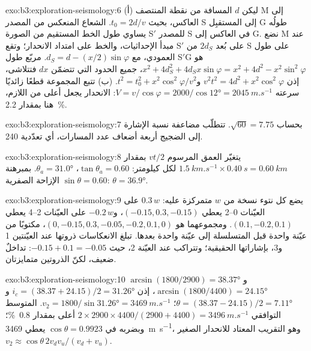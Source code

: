\begin{solution}{exo:b3:exploration-seismology:6}
(أ) ليكن $d$ المسافة من نقطة المنتصف M إلى العاكس، بحيث
$t_0 = 2d/v$. الشعاع المنعكس من المصدر S إلى المستقبِل G طولُه
يساوي طول الخط المستقيم من الصورة S$'$ للمصدر S في العاكس إلى G. نضع M عند
مبدأ الإحداثيات، والخط على امتداد الانحدار؛ وتقع S$'$ على بُعد $2d_S$ من S على طول
العمودي، مع $d_S = d - (x/2)\sin\varphi$. مربّع طول S$'$G هو
$x^2 + 4d_S^2 + 4d_Sx\sin\varphi = x^2 + 4d^2 - x^2\sin^2\varphi$، جميع الحدود
التي تتضمّن $dx$ فتتلاشى، إذن $v^2t^2 = 4d^2 + x^2\cos^2\varphi$
و$t^2 = t_0^2 + x^2\cos^2\varphi/v^2$. (ب) تتبع المجموعة قطعًا زائديًا سرعته
$V = v/\cos\varphi = 2000/\cos\ang{12} = \qty{2045}{m.s^{-1}}$: الانحدار يجعل
 أعلى من اللازم، هنا بمقدار \qty{2.2}{\percent}.
\end{solution}

\begin{solution}{exo:b3:exploration-seismology:7}
بحساب $\sqrt{60} = 7.75$. تتطلّب مضاعفة نسبة الإشارة إلى الضجيج أربعة أضعاف
عدد المسارات، أي تعدّدية 240.
\end{solution}

\begin{solution}{exo:b3:exploration-seismology:8}
يتغيّر العمق المرسوم $vt/2$ بمقدار $\qty{1.5}{km.s^{-1}}\times\qty{0.40}{s}
= \qty{0.60}{km}$ لكل كيلومتر: $\tan\theta_a = 0.60$، $\theta_a = \ang{31.0}$.
بمبرهنة الإزاحة الصفرية $\sin\theta = 0.60$: $\theta = \ang{36.9}$.
\end{solution}

\begin{solution}{exo:b3:exploration-seismology:9}
يضع كل نتوء نسخة من $w$ متمركزة عليه: $0.3\,w$ على العيّنات 0--2 يعطي
$(-0.15, 0.3, -0.15)$، و$-0.2\,w$ على العيّنات 2--4 يعطي $(0.1, -0.2, 0.1)$.
ومجموعهما هو $(0, -0.15, 0.3, -0.05, -0.2, 0.1, 0)$، مكتوبًا من عيّنة واحدة
قبل المتسلسلة إلى عيّنة واحدة بعدها. تبلغ الانعكاسات ذروتها عند العيّنتين 1 و3، بإشاراتها
الحقيقية؛ وتتراكب عند العيّنة 2، حيث $-0.15 + 0.1 = -0.05$: تداخلٌ
ضعيف، لكنّ الذروتين متمايزتان.
\end{solution}

\begin{solution}{exo:b3:exploration-seismology:10}
$\arcsin(1800/2900) = \ang{38.37}$ و$\arcsin(1800/4400) = \ang{24.15}$، إذن
$i_c = (38.37 + 24.15)/2 = \ang{31.26}$ و$\theta = (38.37 - 24.15)/2 =
\ang{7.11}$؛ $v_2 = 1800/\sin\ang{31.26} = \qty{3469}{m.s^{-1}}$. المتوسط
التوافقي $2\times2900\times4400/(2900 + 4400) = \qty{3496}{m.s^{-1}}$ أعلى
بمقدار \qty{0.8}{\percent}؛ وبضربه في $\cos\theta = 0.9923$ يعطي
\qty{3469}{m.s^{-1}}، وهو التقريب المعتاد للانحدار الصغير
$v_2 \approx \cos\theta\,2v_dv_u/(v_d + v_u)$.
\end{solution}

